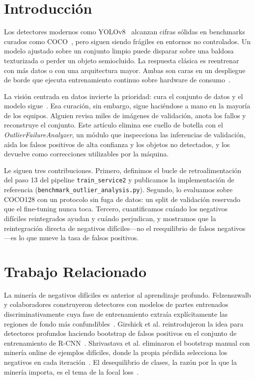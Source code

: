 \documentclass[conference]{IEEEtran}
\begin{document}
\section{Introducción}
Los detectores modernos como YOLOv8~\cite{jocher2023yolo} alcanzan cifras
sólidas en benchmarks curados como COCO~\cite{lin2014coco}, pero siguen siendo
frágiles en entornos no controlados. Un modelo ajustado sobre un conjunto
limpio puede disparar sobre una baldosa texturizada o perder un objeto
semiocluido. La respuesta clásica es reentrenar con más datos o con una
arquitectura mayor. Ambas son caras en un despliegue de borde que ejecuta
entrenamiento continuo sobre hardware de consumo~\cite{zhou2019edge, kreuzberger2023mlops}.

La visión centrada en datos invierte la prioridad: cura el conjunto de datos y
el modelo sigue~\cite{zha2023datacentric}. Esa curación, sin embargo, sigue
haciéndose a mano en la mayoría de los equipos. Alguien revisa miles de
imágenes de validación, anota los fallos y reconstruye el conjunto. Este
artículo elimina ese cuello de botella con el \textit{OutlierFailureAnalyzer},
un módulo que inspecciona las inferencias de validación, aísla los falsos
positivos de alta confianza y los objetos no detectados, y los devuelve como
correcciones utilizables por la máquina.

Le siguen tres contribuciones. Primero, definimos el bucle de
retroalimentación del paso 13 del pipeline \texttt{train\_service2} y
publicamos la implementación de referencia
(\texttt{benchmark\_outlier\_analysis.py}). Segundo, lo evaluamos sobre
COCO128 con un protocolo sin fuga de datos: un split de validación reservado
que el fine-tuning nunca toca. Tercero, cuantificamos cuándo los negativos
difíciles reintegrados ayudan y cuándo perjudican, y mostramos que la
reintegración directa de negativos difíciles---no el reequilibrio de falsos
negativos---es lo que mueve la tasa de falsos positivos.

\section{Trabajo Relacionado}
La minería de negativos difíciles es anterior al aprendizaje profundo.
Felzenszwalb y colaboradores construyeron detectores con modelos de partes
entrenados discriminativamente cuya fase de entrenamiento extraía
explícitamente las regiones de fondo más confundibles~\cite{felzenszwalb2010dpm}.
Girshick et al. reintrodujeron la idea para detectores profundos haciendo
bootstrap de falsos positivos en el conjunto de entrenamiento de
R-CNN~\cite{girshick2014rcnn}. Shrivastava et al. eliminaron el bootstrap
manual con minería online de ejemplos difíciles, donde la propia pérdida
selecciona los negativos en cada iteración~\cite{shrivastava2016hard}. El
desequilibrio de clases, la razón por la que la minería importa, es el tema de
la focal loss~\cite{lin2017focal}.
\end{document}
